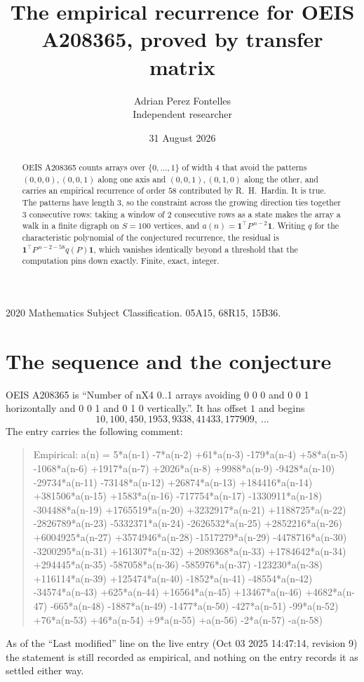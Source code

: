 \documentclass[11pt,a4paper]{article}
\title{The empirical recurrence for OEIS A208365, proved by transfer matrix}
\author{Adrian Perez Fontelles\\ \small Independent researcher}
\date{31 August 2026}
\theoremstyle{plain}
\theoremstyle{definition}
\begin{document}
\maketitle

\begin{abstract}
OEIS A208365 counts arrays over $\{0,\dots,1\}$ of width $4$ that avoid the patterns
$(0,0,0), (0,0,1)$ along one axis and $(0,0,1), (0,1,0)$ along the other, and carries an empirical recurrence of
order $58$ contributed by R.~H.~Hardin. It is true. The patterns have length $3$, so
the constraint across the growing direction ties together $3$ consecutive rows: taking a
window of $2$ consecutive rows as a state makes the array a walk in a finite digraph
on $S=100$ vertices, and $a(n)=\mathbf{1}^{\!\top}P^{\,n-2}\mathbf{1}$. Writing $q$
for the characteristic polynomial of the conjectured recurrence, the residual is
$\mathbf{1}^{\!\top}P^{\,n-2-58}q(P)\mathbf{1}$, which vanishes identically
beyond a threshold that the computation pins down exactly. Finite, exact, integer.
\end{abstract}

\noindent\small 2020 Mathematics Subject Classification. 05A15, 68R15, 15B36.\normalsize

\section{The sequence and the conjecture}

OEIS A208365 is ``Number of nX4 0..1 arrays avoiding 0 0 0 and 0 0 1 horizontally and 0 0 1 and 0 1 0 vertically.''. It has offset
$1$ and begins
\[
10, 100, 450, 1953, 9338, 41433, 177909,\ \dots
\]
The entry carries the following comment:
\begin{quote}\small
Empirical: a(n) = 5*a(n-1) -7*a(n-2) +61*a(n-3) -179*a(n-4) +58*a(n-5) -1068*a(n-6) +1917*a(n-7) +2026*a(n-8) +9988*a(n-9) -9428*a(n-10) -29734*a(n-11) -73148*a(n-12) +26874*a(n-13) +184416*a(n-14) +381506*a(n-15) +1583*a(n-16) -717754*a(n-17) -1330911*a(n-18) -304488*a(n-19) +1765519*a(n-20) +3232917*a(n-21) +1188725*a(n-22) -2826789*a(n-23) -5332371*a(n-24) -2626532*a(n-25) +2852216*a(n-26) +6004925*a(n-27) +3574946*a(n-28) -1517279*a(n-29) -4478716*a(n-30) -3200295*a(n-31) +161307*a(n-32) +2089368*a(n-33) +1784642*a(n-34) +294445*a(n-35) -587058*a(n-36) -585976*a(n-37) -123230*a(n-38) +116114*a(n-39) +125474*a(n-40) -1852*a(n-41) -48554*a(n-42) -34574*a(n-43) +625*a(n-44) +16564*a(n-45) +13467*a(n-46) +4682*a(n-47) -665*a(n-48) -1887*a(n-49) -1477*a(n-50) -427*a(n-51) -99*a(n-52) +76*a(n-53) +46*a(n-54) +9*a(n-55) +a(n-56) -2*a(n-57) -a(n-58)
\end{quote}
As of the ``Last modified'' line on the live entry (Oct 03 2025 14:47:14, revision
9) the statement is still recorded as empirical, and nothing on the entry
records it as settled either way.
\end{document}
